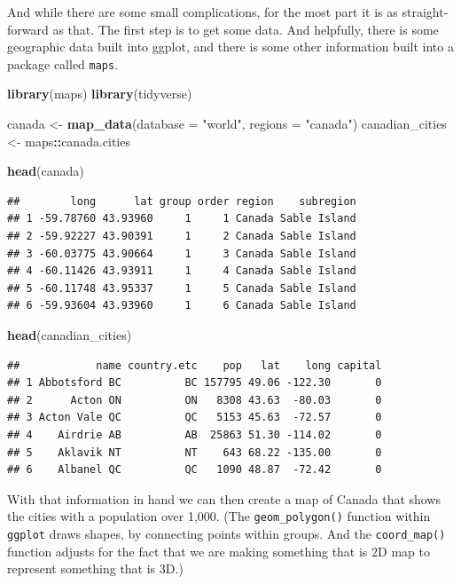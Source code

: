 \documentclass[
]{book}
\newenvironment{Shaded}{\begin{snugshade}}{\end{snugshade}}
\newcommand{\DataTypeTok}[1]{\textcolor[rgb]{0.13,0.29,0.53}{#1}}
\newcommand{\KeywordTok}[1]{\textcolor[rgb]{0.13,0.29,0.53}{\textbf{#1}}}
\newcommand{\NormalTok}[1]{#1}
\newcommand{\OperatorTok}[1]{\textcolor[rgb]{0.81,0.36,0.00}{\textbf{#1}}}
\newcommand{\StringTok}[1]{\textcolor[rgb]{0.31,0.60,0.02}{#1}}
\begin{document}
And while there are some small complications, for the most part it is as straight-forward as that. The first step is to get some data. And helpfully, there is some geographic data built into ggplot, and there is some other information built into a package called \texttt{maps}.

\begin{Shaded}
\begin{Highlighting}[]
\KeywordTok{library}\NormalTok{(maps)}
\KeywordTok{library}\NormalTok{(tidyverse)}

\NormalTok{canada <-}\StringTok{ }\KeywordTok{map_data}\NormalTok{(}\DataTypeTok{database =} \StringTok{"world"}\NormalTok{, }\DataTypeTok{regions =} \StringTok{"canada"}\NormalTok{)}
\NormalTok{canadian_cities <-}\StringTok{ }\NormalTok{maps}\OperatorTok{::}\NormalTok{canada.cities}

\KeywordTok{head}\NormalTok{(canada)}
\end{Highlighting}
\end{Shaded}

\begin{verbatim}
##        long      lat group order region    subregion
## 1 -59.78760 43.93960     1     1 Canada Sable Island
## 2 -59.92227 43.90391     1     2 Canada Sable Island
## 3 -60.03775 43.90664     1     3 Canada Sable Island
## 4 -60.11426 43.93911     1     4 Canada Sable Island
## 5 -60.11748 43.95337     1     5 Canada Sable Island
## 6 -59.93604 43.93960     1     6 Canada Sable Island
\end{verbatim}

\begin{Shaded}
\begin{Highlighting}[]
\KeywordTok{head}\NormalTok{(canadian_cities)}
\end{Highlighting}
\end{Shaded}

\begin{verbatim}
##            name country.etc    pop   lat    long capital
## 1 Abbotsford BC          BC 157795 49.06 -122.30       0
## 2      Acton ON          ON   8308 43.63  -80.03       0
## 3 Acton Vale QC          QC   5153 45.63  -72.57       0
## 4    Airdrie AB          AB  25863 51.30 -114.02       0
## 5    Aklavik NT          NT    643 68.22 -135.00       0
## 6    Albanel QC          QC   1090 48.87  -72.42       0
\end{verbatim}

With that information in hand we can then create a map of Canada that shows the cities with a population over 1,000. (The \texttt{geom\_polygon()} function within \texttt{ggplot} draws shapes, by connecting points within groups. And the \texttt{coord\_map()} function adjusts for the fact that we are making something that is 2D map to represent something that is 3D.)
\end{document}
